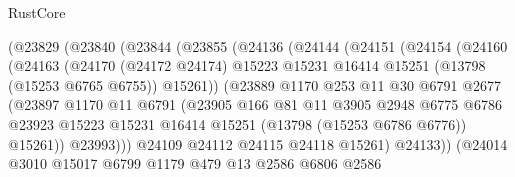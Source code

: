 \begin{lexlean}{RustCore}
\begin{coremodule}
                  (@23829
                    (@23840
                      (@23844
                        (@23855
                          (@24136
                            (@24144
                              (@24151
                                (@24154
                                  (@24160
                                    (@24163
                                      (@24170
                                        (@24172 @24174)
                                        @15223
                                        @15231
                                        @16414
                                        @15251
                                        (@13798 (@15253 @6765 @6755))
                                        @15261))
                                    (@23889
                                      @1170
                                      @253
                                      @11
                                      @30
                                      @6791
                                      @2677
                                      (@23897
                                        @1170
                                        @11
                                        @6791
                                        (@23905
                                          @166
                                          @81
                                          @11
                                          @3905
                                          @2948
                                          @6775
                                          @6786
                                          @23923
                                          @15223
                                          @15231
                                          @16414
                                          @15251
                                          (@13798 (@15253 @6786 @6776))
                                          @15261))
                                      @23993)))
                                @24109
                                @24112
                                @24115
                                @24118
                                @15261)
                              @24133))
                          (@24014
                            @3010
                            @15017
                            @6799
                            @1179
                            @479
                            @13
                            @2586
                            @6806
                            @2586

\end{coremodule}
\end{lexlean}
